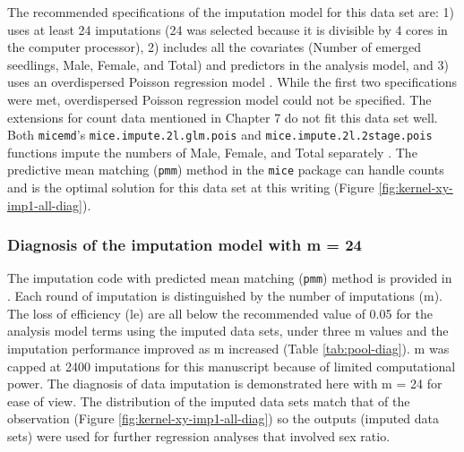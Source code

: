 \documentclass[
]{article}
\begin{document}
The recommended specifications of the imputation model for this data set are: 1) uses at least 24 imputations (24 was selected because it is divisible by 4 cores in the computer processor), 2) includes all the covariates (Number of emerged seedlings, Male, Female, and Total) and predictors in the analysis model, and 3) uses an overdispersed Poisson regression model \citetext{\citealp{azurMultipleImputationChained2011}; \citealp{whiteMultipleImputationUsing2011}; \citealp[and][]{nguyenModelCheckingMultiple2017}}. While the first two specifications were met, overdispersed Poisson regression model could not be specified. The extensions for count data mentioned in Chapter 7 \citep{vanbuurenFlexibleImputationMissing2018} do not fit this data set well. Both \texttt{micemd}'s \texttt{mice.impute.2l.glm.pois} and \texttt{mice.impute.2l.2stage.pois} functions impute the numbers of Male, Female, and Total separately \citep{audigierMicemdMultipleImputation2021}. The predictive mean matching (\texttt{pmm}) method in the \texttt{mice} package can handle counts \citep{vanbuurenMiceMultivariateImputation2011} and is the optimal solution for this data set at this writing (Figure \ref{fig:kernel-xy-imp1-all-diag}).

\hypertarget{diagnosis-of-the-imputation-model-with-m-24}{%
\subsubsection*{Diagnosis of the imputation model with m = 24}\label{diagnosis-of-the-imputation-model-with-m-24}}

The imputation code with predicted mean matching (\texttt{pmm}) method is provided in \citep{nguyenDataImpactCropping2022}. Each round of imputation is distinguished by the number of imputations (m). The loss of efficiency (le) are all below the recommended value of 0.05 \citep{whiteMultipleImputationUsing2011} for the analysis model terms using the imputed data sets, under three m values and the imputation performance improved as m increased (Table \ref{tab:pool-diag}). m was capped at 2400 imputations for this manuscript because of limited computational power. The diagnosis of data imputation is demonstrated here with m = 24 for ease of view. The distribution of the imputed data sets match that of the observation (Figure \ref{fig:kernel-xy-imp1-all-diag}) so the outputs (imputed data sets) were used for further regression analyses that involved sex ratio.
\end{document}
